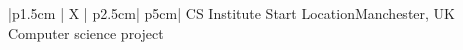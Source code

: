 
%
\iftrue %
\begin{myTableEnv}{|p{1.5cm} | X | p{2.5cm}| p{5cm}|}
    \myRow
        {}{CS Institute}
        {Start}{}
    \myRow
        {Location}{Manchester, UK}
        {}{Computer science project}
\end{myTableEnv}
%
\fi
%